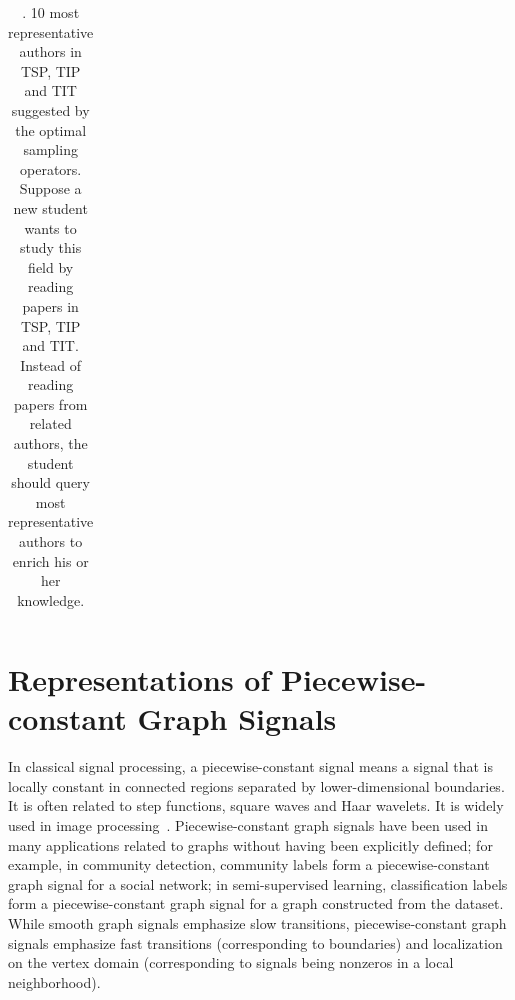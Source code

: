 \documentclass[journal,twocolumn,10pt]{IEEEtran}
\theoremstyle{definition}
\begin{document}
\begin{table}[htbp]
\begin{center}
\begin{tabular}{@{}llll@{}}




\bottomrule
\end{tabular} 
\caption{\label{tab:tsp_sample}. 10 most representative authors in TSP, TIP and TIT suggested by the optimal sampling operators. Suppose a new student wants to study this field by reading papers in TSP, TIP and TIT. Instead of reading papers from related authors, the student should query most representative authors to enrich his or her knowledge.}
\end{center}
\end{table}




\section{Representations of Piecewise-constant Graph Signals}
\label{sec:R_PC}
In classical signal processing, a piecewise-constant signal means a signal that is locally constant in connected regions separated by lower-dimensional boundaries. It is often related to step functions, square waves and Haar wavelets. It is widely used in image processing~\cite{VetterliKG:12}. Piecewise-constant graph signals have been used in many applications related to graphs without having been explicitly defined; for example, in community detection, community
labels form a piecewise-constant graph signal for a social network; in
semi-supervised learning, classification labels form
a piecewise-constant graph signal for a graph constructed from
the dataset. While smooth graph signals emphasize slow transitions,
piecewise-constant graph signals emphasize fast transitions
(corresponding to boundaries) and localization on the vertex domain (corresponding to
signals being nonzeros in a local neighborhood).
\end{document}
